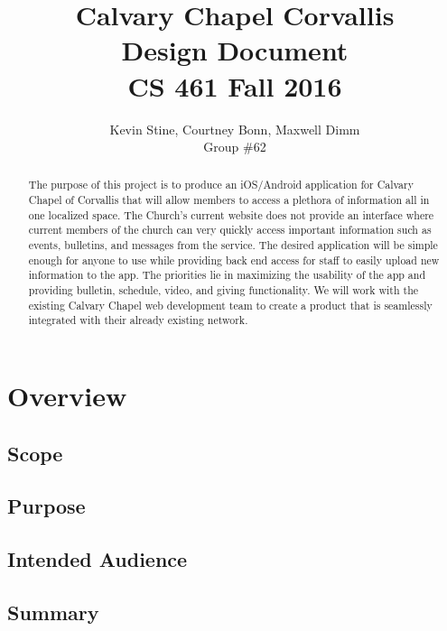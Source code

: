 \documentclass[letterpaper,10pt,draftclsnofoot,onecolumn,titlepage]{IEEEtran}
\def\name{Kevin Stine, Courtney Bonn, Maxwell Dimm}
\def\team{Calvary Chapel Corvallis}
\def\grp{Group \#62}
\begin{document}
	\title{\huge \team \\ Design Document \\ CS 461 Fall 2016}
	\author{\large \name \\ \grp}

	

	\maketitle

	
		\begin{abstract}The purpose of this project is to produce an iOS/Android application for Calvary Chapel of Corvallis that will allow members to access a plethora of information all in one localized space.
		The Church's current website does not provide an interface where current members of the church can very quickly access important information such as events, bulletins, and messages from the service.
		The desired application will be simple enough for anyone to use while providing back end access for staff to easily upload new information to the app.
		The priorities lie in maximizing the usability of the app and providing bulletin, schedule, video, and giving functionality.
		We will work with the existing Calvary Chapel web development team to create a product that is seamlessly integrated with their already existing network.
		\end{abstract}


	\clearpage

	\tableofcontents

	\clearpage
	
	\section{Overview}
	
		\subsection{Scope}
		
		\subsection{Purpose}
		
		\subsection{Intended Audience}
		
		\subsection{Summary}
		
\end{document}
